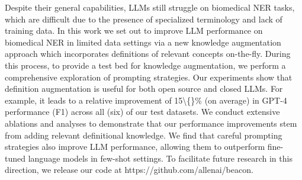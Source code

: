 Despite their general capabilities, LLMs still struggle on biomedical NER tasks, which are difficult due to the presence of specialized terminology and lack of training data.  In this work we set out to improve LLM performance on biomedical NER in limited data settings via a new knowledge augmentation approach which incorporates definitions of relevant concepts on-the-fly.  During this process, to provide a test bed for knowledge augmentation, we perform a comprehensive exploration of prompting strategies.  Our experiments show that definition augmentation is useful for both open source and closed LLMs. For example, it leads to a relative improvement of 15\textbackslash\{\}\% (on average) in GPT-4 performance (F1) across all (six) of our test datasets.  We conduct extensive ablations and analyses to demonstrate that our performance improvements stem from adding relevant definitional knowledge.  We find that careful prompting strategies also improve LLM performance, allowing them to outperform fine-tuned language models in few-shot settings.   To facilitate future research in this direction, we release our code at https://github.com/allenai/beacon.